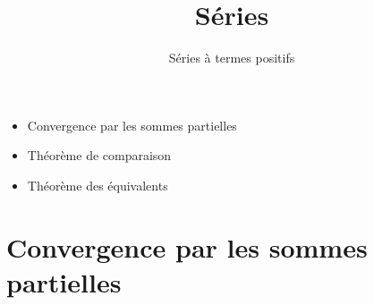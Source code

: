 


   





\title{{\bf Séries}}
\subtitle{Séries à termes positifs}

\begin{frame}
  
  \debutmontitre

  \pause

{\footnotesize
\hfill
{}
\begin{minipage}{0.6\textwidth}
  \begin{itemize}
    \item<3-> Convergence par les sommes partielles
    \item<4-> Théorème de comparaison
    \item<5-> Théorème des équivalents
  \end{itemize}
\end{minipage}
}

\end{frame}

\setcounter{framenumber}{0}



\section{Convergence par les sommes partielles}

